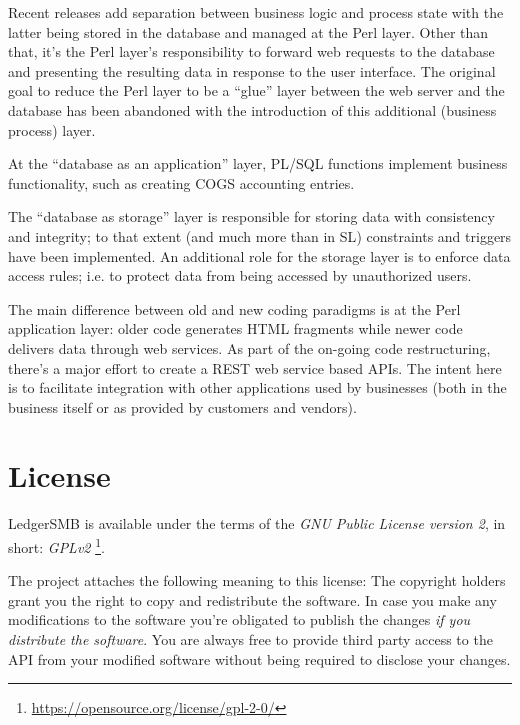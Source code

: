 Recent releases add separation between business logic and process state with the
latter being stored in the database and managed at the Perl layer.  Other than that, it's the Perl layer's responsibility to forward web requests to the database and
presenting the resulting data in response to the user interface.
The original goal to reduce the Perl layer to be a ``glue'' layer between the web
server and the database has been abandoned with  the introduction of this additional
(business process) layer.

At the ``database as an application'' layer, \gls{PL/SQL} functions implement business
functionality, such as creating \gls{COGS} accounting entries.

The ``database as storage'' layer is responsible for storing data with consistency and
integrity; to that extent (and much more than in \acrshort{SL}) constraints and triggers
have been implemented.  An additional role for the storage layer is to enforce data
access rules; i.e. to protect data from being accessed by unauthorized users.

The main difference between old and new coding paradigms is at the Perl application
layer: older code generates HTML fragments while newer code delivers data through
web services.  As part of the on-going code restructuring, there's a major effort
to create a \gls{REST} web service based APIs.  The intent here is to facilitate
integration with other applications used by businesses (both in the business itself
or as provided by customers and vendors).






\section{License}
\label{sec-ledgersmb-license}

LedgerSMB is available under the terms of the
\textit{GNU Public License version 2}, in short: \textit{GPLv2}
\footnote{\url{https://opensource.org/license/gpl-2-0/}}.

The project attaches the following meaning to this license:
The copyright holders grant you the right to copy and
redistribute the software.  In case you make any modifications to the software
you're obligated to publish the changes \textit{if you distribute the software}.  You are always free to provide third party access to
the \acrshort{API} from your modified software without being required to disclose your changes.

